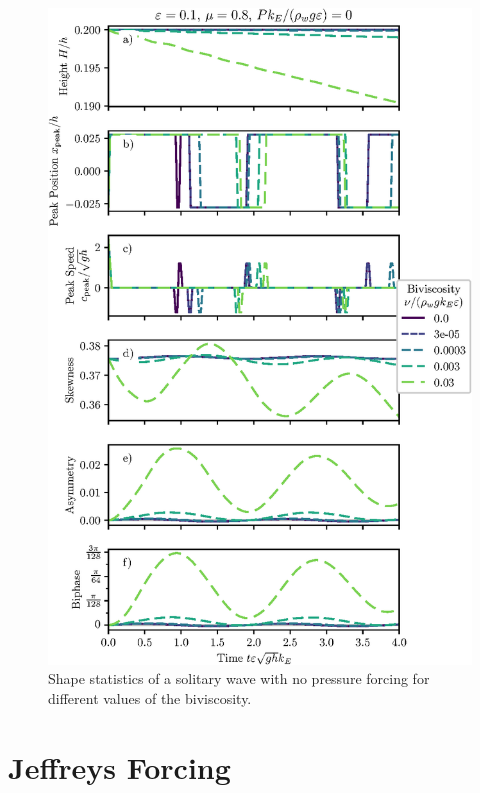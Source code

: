 \documentclass{jfm}
\let\Oldsection\section
\renewcommand{\section}{\FloatBarrier\Oldsection}
\begin{document}
\begin{figure}
  \centering
  \includegraphics{Biviscosity.eps}
  \caption{
    Shape statistics of a solitary wave with no pressure forcing for
    different values of the biviscosity.
  }
\end{figure}

\section{Jeffreys Forcing}
\end{document}
